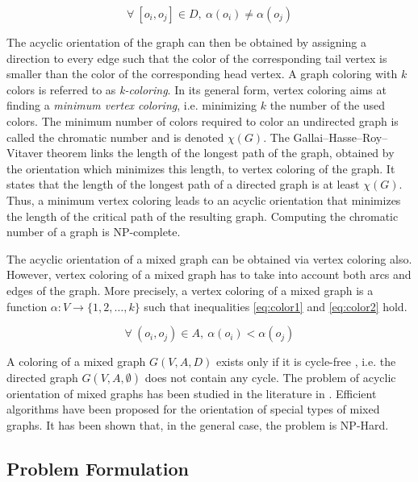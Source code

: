 \begin{equation}
\forall\ [o_i,o_j] \in D,\ \alpha(o_i) \neq \alpha(o_j)
\label{eq:color1}
\end{equation}

The acyclic orientation of the graph can then be obtained by assigning a direction to every edge such that the color of the corresponding tail vertex is smaller than the color of the corresponding head vertex. A graph coloring with $k$ colors is referred to as \textit{k-coloring}. In its general form, vertex coloring aims at finding a \textit{minimum vertex coloring}, i.e. minimizing $k$ the number of the used colors. The minimum number of colors required to color an undirected graph is called the chromatic number and is denoted $\chi(G)$. The Gallai–Hasse–Roy–Vitaver theorem \cite{gallai:1968,roy:1967,hasse:1966,vitaver:1962} links the length of the longest path of the graph, obtained by the orientation which minimizes this length, to vertex coloring of the graph. It states that the length of the longest path of a directed graph is at least $\chi(G)$. Thus, a minimum vertex coloring leads to an acyclic orientation that minimizes the length of the critical path of the resulting graph. Computing the chromatic number of a graph is NP-complete.

The acyclic orientation of a mixed graph can be obtained via vertex coloring also. However, vertex coloring of a mixed graph has to take into account both arcs and edges of the graph. More precisely, a vertex coloring of a mixed graph is a function $\alpha: V \rightarrow \{1, 2, \ldots, k\}$ such that inequalities \ref{eq:color1} and \ref{eq:color2} hold.

\begin{equation}
\forall\ (o_i,o_j) \in A,\ \alpha(o_i) < \alpha(o_j)
\label{eq:color2}
\end{equation}

A coloring of a mixed graph $G(V,A,D)$ exists only if it is cycle-free \cite{ries:2007}, i.e. the directed graph $G(V,A,\emptyset)$ does not contain any cycle. The problem of acyclic orientation of mixed graphs has been studied in the literature in \cite{andreev:2000,sotskov:2002,al-anzi:2006}. Efficient algorithms have been proposed for the orientation of special types of mixed graphs. It has been shown that, in the general case, the problem is NP-Hard.

\subsection{Problem Formulation}

